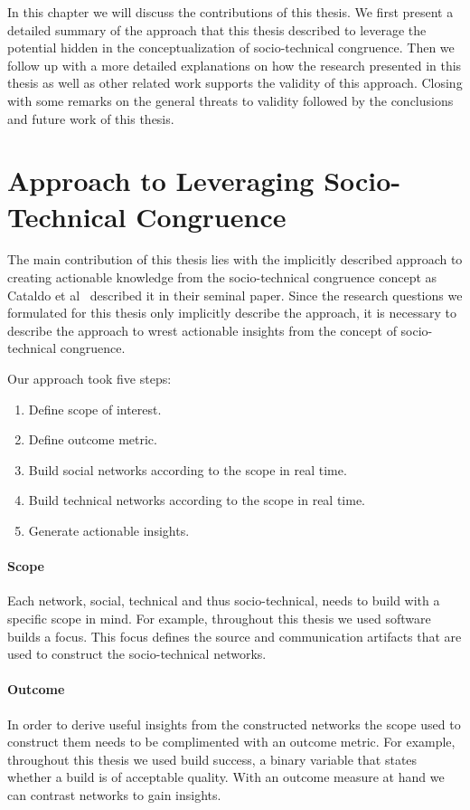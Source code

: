 In this chapter we will discuss the contributions of this thesis.
We first present a detailed summary of the approach that this thesis described to leverage the potential hidden in the conceptualization of socio-technical congruence.
Then we follow up with a more detailed explanations on how the research presented in this thesis as well as other related work supports the validity of this approach.
Closing with some remarks on the general threats to validity followed by the conclusions and future work of this thesis.

\section{Approach to Leveraging Socio-Technical Congruence}
The main contribution of this thesis lies with the implicitly described approach to creating actionable knowledge from the socio-technical congruence concept as Cataldo et al~\cite{cataldo:cscw:2006} described it in their seminal paper.
Since the research questions we formulated for this thesis only implicitly describe the approach, it is necessary to describe the approach to wrest actionable insights from the concept of socio-technical congruence.

Our approach took five steps:
\begin{enumerate}
\item Define scope of interest.
\item Define outcome metric.
\item Build social networks according to the scope in real time.
\item Build technical networks according to the scope in real time.
\item Generate actionable insights.
\end{enumerate}

\paragraph{Scope} 
Each network, social, technical and thus socio-technical, needs to build with a specific scope in mind.
For example, throughout this thesis we used software builds a focus.
This focus defines the source and communication artifacts that are used to construct the socio-technical networks. 

\paragraph{Outcome}
In order to derive useful insights from the constructed networks the scope used to construct them needs to be complimented with an outcome metric.
For example, throughout this thesis we used build success, a binary variable that states whether a build is of acceptable quality.
With an outcome measure at hand we can contrast networks to gain insights.

